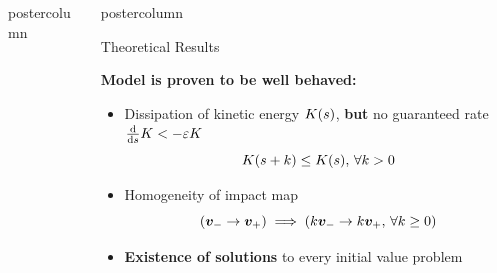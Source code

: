 \documentclass[final,hyperref={pdfpagelabels=false},5pt]{beamer}
\newlength{\columnheight}
\begin{document}
\begin{frame}
\begin{columns}
\begin{column}{.49\textwidth}
\begin{beamercolorbox}[center,wd=\textwidth]{postercolumn}
\begin{minipage}[T]{.95\textwidth}
{\begin{columns}[c]
\begin{column}{.64\textwidth}
				\end{column}
				\end{columns}
				

    
          }
        \end{minipage}
        
      \end{beamercolorbox}
      
    \end{column}

\hfill

    \begin{column}{.49\textwidth}
      \begin{beamercolorbox}[center,wd=\textwidth]{postercolumn}
        \begin{minipage}[T]{.95\textwidth} %
          \parbox[t][\columnheight]{\textwidth}{ %
             \begin{block}{Theoretical Results}
             \begin{center}
             	\textbf{Model is proven to be well behaved:}
             \end{center}
              \begin{itemize}
              \item Dissipation of kinetic energy $K(s)$, \textbf{but} no guaranteed rate $\frac{{\mathrm{d}} }{{\mathrm{d}}s}K < - \varepsilon K$
               $$K (s + k) \leq K (s),\, \forall k > 0$$
              \item Homogeneity of impact map
              	$$\left( \bm{v}_- \to \bm{v}_+ \right) \implies \left( k\bm{v}_- \to k\bm{v}_+,\, \forall k \geq 0 \right)$$
              \item \textbf{Existence of solutions} to every initial value problem
              \end{itemize}
              \vspace{1ex}
              \begin{center}

\end{center}
\end{block}}
\end{minipage}
\end{beamercolorbox}
\end{column}
\end{columns}
\end{frame}
\end{document}
